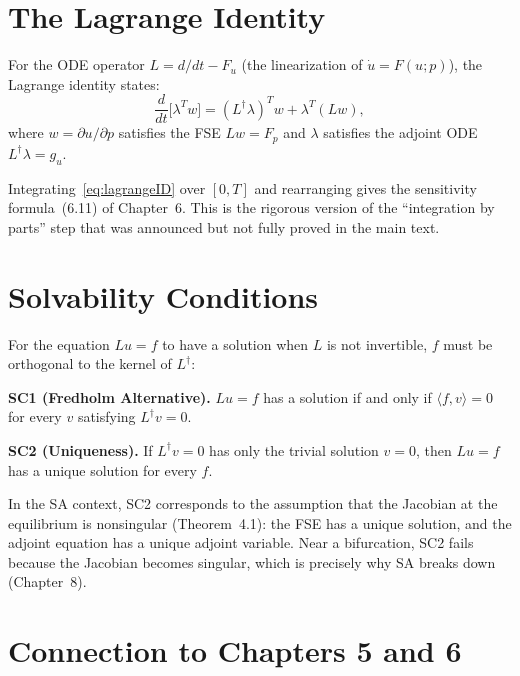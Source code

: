 \section{The Lagrange Identity}
\label{appsec:lagrange}

For the ODE operator $L = d/dt - F_u$ (the linearization of $\dot{u} = F(u;p)$),
the Lagrange identity states:
\begin{equation}
  \frac{d}{dt}\bigl[\lambda^T w\bigr]
  = (L^\dagger\lambda)^T w + \lambda^T (Lw),
  \label{eq:lagrangeID}
\end{equation}
where $w = \partial u/\partial p$ satisfies the FSE $Lw = F_p$ and
$\lambda$ satisfies the adjoint ODE $L^\dagger\lambda = g_u$.

Integrating~\eqref{eq:lagrangeID} over $[0,T]$ and rearranging gives the
sensitivity formula~(6.11) of Chapter~6. This is the rigorous version of
the ``integration by parts'' step that was announced but not fully proved
in the main text.

\section{Solvability Conditions}
\label{appsec:solvability}

For the equation $Lu = f$ to have a solution when $L$ is not invertible,
$f$ must be orthogonal to the kernel of $L^\dagger$:

\textbf{SC1 (Fredholm Alternative).}
$Lu = f$ has a solution if and only if $\langle f, v\rangle = 0$
for every $v$ satisfying $L^\dagger v = 0$.

\textbf{SC2 (Uniqueness).}
If $L^\dagger v = 0$ has only the trivial solution $v = 0$,
then $Lu = f$ has a unique solution for every $f$.

In the SA context, SC2 corresponds to the assumption that the Jacobian
at the equilibrium is nonsingular (Theorem~4.1): the FSE has a unique
solution, and the adjoint equation has a unique adjoint variable.
Near a bifurcation, SC2 fails because the Jacobian becomes singular,
which is precisely why SA breaks down (Chapter~8).

\section{Connection to Chapters 5 and 6}
\label{appsec:connection}

